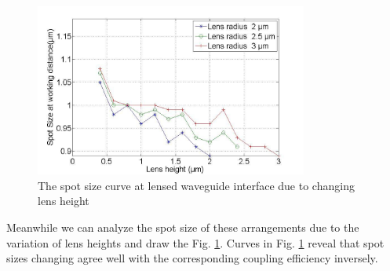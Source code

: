 \begin{figure}[!ht]
\centering
\includegraphics[width=0.8\textwidth]{bilder/spot_fix_lens_radium_hxx}
\caption{The spot size curve at lensed waveguide interface due to changing lens height}
\label{fig:lensed_guide_spot_size_curve}
\end{figure} 
Meanwhile we can analyze the spot size of these arrangements due to the variation of lens heights and draw the Fig. \ref{fig:lensed_guide_spot_size_curve}. Curves in Fig. \ref{fig:lensed_guide_spot_size_curve} reveal that spot sizes changing agree well with the corresponding coupling efficiency inversely.
